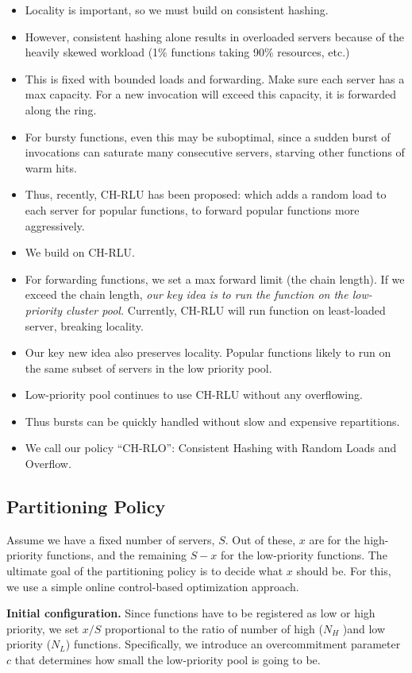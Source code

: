 \begin{itemize}
\item Locality is important, so we must build on consistent hashing. 
\item However, consistent hashing alone results in overloaded servers because of the heavily skewed workload (1\% functions taking 90\% resources, etc.)
\item This is fixed with bounded loads and forwarding. Make sure each server has a max capacity. For a new invocation will exceed this capacity, it is forwarded along the ring. 
\item For bursty functions, even this may be suboptimal, since a sudden burst of invocations can saturate many consecutive servers, starving other functions of warm hits. 
\item Thus, recently, CH-RLU has been proposed: which adds a random load to each server for popular functions, to forward popular functions more aggressively. 
\item We build on CH-RLU. 
\item For forwarding functions, we set a max forward limit (the chain length). If we exceed the chain length, \emph{our key idea is to run the function on the low-priority cluster pool.} Currently, CH-RLU will run function on least-loaded server, breaking locality. 
\item Our key new idea also preserves locality. Popular functions likely to run on the same subset of servers in the low priority pool. 
\item Low-priority pool continues to use CH-RLU without any overflowing. 
\item Thus bursts can be quickly handled without slow and expensive repartitions. 
\item We call our policy ``CH-RLO'': Consistent Hashing with Random Loads and Overflow. 
\end{itemize}


\subsection{Partitioning Policy}

Assume we have a fixed number of servers, $S$. 
Out of these, $x$ are for the high-priority functions, and the remaining $S-x$ for the low-priority functions. 
The ultimate goal of the partitioning policy is to decide what $x$ should be. For this, we use a simple online control-based optimization approach. 

\textbf{Initial configuration.}
Since functions have to be registered as low or high priority, we set $x/S$ proportional to the ratio of number of high ($N_H$ )and low priority ($N_L$) functions.
Specifically, we introduce an overcommitment parameter $c$ that determines how small the low-priority pool is going to be.


